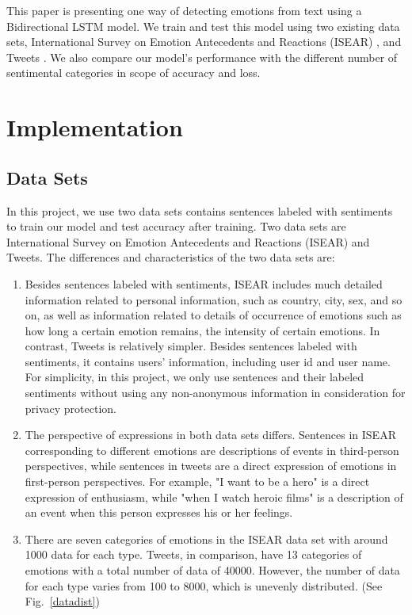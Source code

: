 \documentclass[11pt,a4paper,man,floatsintext]{apa6}
\begin{document}
This paper is presenting one way of detecting emotions from text using a Bidirectional LSTM model. We train and test this model using two existing data sets, International Survey on Emotion Antecedents and Reactions (ISEAR) \cite{ISEAR}, and Tweets \cite{TweetData}. We also compare our model's performance with the different number of sentimental categories in scope of accuracy and loss.

\section{Implementation}

\subsection{Data Sets}
In this project, we use two data sets contains sentences labeled with sentiments to train our model and test accuracy after training. Two data sets are International Survey on Emotion Antecedents and Reactions (ISEAR) and Tweets. The differences and characteristics of the two data sets are:
\begin{enumerate}
    \item Besides sentences labeled with sentiments, ISEAR includes much detailed information related to personal information, such as country, city, sex, and so on, as well as information related to details of occurrence of emotions such as how long a certain emotion remains, the intensity of certain emotions. In contrast, Tweets is relatively simpler. Besides sentences labeled with sentiments, it contains users' information, including user id and user name. For simplicity, in this project, we only use sentences and their labeled sentiments without using any non-anonymous information in consideration for privacy protection.
    \item The perspective of expressions in both data sets differs. Sentences in ISEAR corresponding to different emotions are descriptions of events in third-person perspectives, while sentences in tweets are a direct expression of emotions in first-person perspectives. For example, "I want to be a hero" is a direct expression of enthusiasm, while "when I watch heroic films" is a description of an event when this person expresses his or her feelings.
    \item There are seven categories of emotions in the ISEAR data set with around 1000 data for each type. Tweets, in comparison, have 13 categories of emotions with a total number of data of 40000. However, the number of data for each type varies from 100 to 8000, which is unevenly distributed. (See Fig.~\ref{datadist})
\end{enumerate} 
\end{document}
